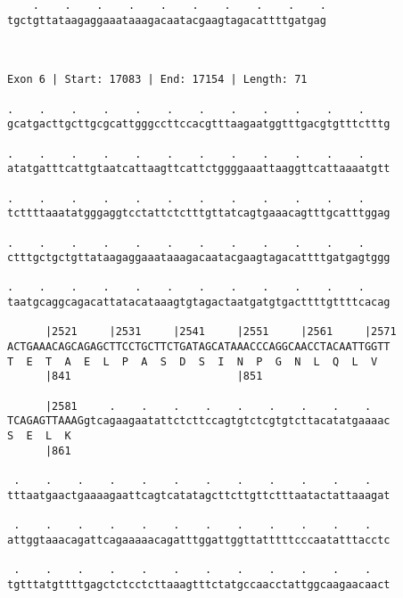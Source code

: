 \documentclass{article}
\begin{document}
\begin{Verbatim}
    .    .    .    .    .    .    .    .    .    .
tgctgttataagaggaaataaagacaatacgaagtagacattttgatgag
                                                  
                                                  
 
Exon 6 | Start: 17083 | End: 17154 | Length: 71
 
.    .    .    .    .    .    .    .    .    .    .    .    
gcatgacttgcttgcgcattgggccttccacgtttaagaatggtttgacgtgtttctttg
                                                            
.    .    .    .    .    .    .    .    .    .    .    .    
atatgatttcattgtaatcattaagttcattctggggaaattaaggttcattaaaatgtt
                                                            
.    .    .    .    .    .    .    .    .    .    .    .    
tcttttaaatatgggaggtcctattctctttgttatcagtgaaacagtttgcatttggag
                                                            
.    .    .    .    .    .    .    .    .    .    .    .    
ctttgctgctgttataagaggaaataaagacaatacgaagtagacattttgatgagtggg
                                                            
.    .    .    .    .    .    .    .    .    .    .    .    
taatgcaggcagacattatacataaagtgtagactaatgatgtgacttttgttttcacag
                                                            
      |2521     |2531     |2541     |2551     |2561     |2571
ACTGAAACAGCAGAGCTTCCTGCTTCTGATAGCATAAACCCAGGCAACCTACAATTGGTT
T  E  T  A  E  L  P  A  S  D  S  I  N  P  G  N  L  Q  L  V  
      |841                          |851                    
  
      |2581     .    .    .    .    .    .    .    .    .   
TCAGAGTTAAAGgtcagaagaatattctcttccagtgtctcgtgtcttacatatgaaaac
S  E  L  K                                                  
      |861                                                  
  
 .    .    .    .    .    .    .    .    .    .    .    .   
tttaatgaactgaaaagaattcagtcatatagcttcttgttctttaatactattaaagat
                                                            
 .    .    .    .    .    .    .    .    .    .    .    .   
attggtaaacagattcagaaaaacagatttggattggttatttttcccaatatttacctc
                                                            
 .    .    .    .    .    .    .    .    .    .    .    .   
tgtttatgttttgagctctcctcttaaagtttctatgccaacctattggcaagaacaact
                                                            

\end{Verbatim}
\end{document}
